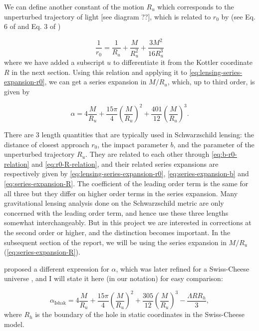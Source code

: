We can define another constant of the motion $R_u$ which corresponds to the unperturbed trajectory of light [see diagram ??], which is related to $r_0$ by (see Eq. 6 of \citet{ishak2008new} and Eq. 3 of \citet{butcher2016no})

\begin{equation}
  \frac{1}{r_0} = \frac{1}{R_u} + \frac{M}{R_u^2} + \frac{3M^2}{16R_u^3}
  \label{eq:r0-R-relation}
\end{equation}
where we have added a subscript $u$ to differentiate it from the Kottler coordinate $R$ in the next section. Using this relation and applying it to \autoref{eq:lensing-series-expansion-r0}, we can get a series expansion in $M/R_u$, which, up to third order, is given by

\begin{equation}
  \alpha = 4 \frac{M}{R_u} + \frac{15\pi}{4} \left ( \frac{M}{R_u} \right )^2 + \frac{401}{12} \left ( \frac{M}{R_u} \right )^3.
  \label{eq:series-expansion-R}
\end{equation}

There are 3 length quantities that are typically used in Schwarzschild lensing: the distance of closest approach $r_0$, the impact parameter $b$, and the parameter of the unperturbed trajectory $R_u$. They are related to each other through \autoref{eq:b-r0-relation} and \autoref{eq:r0-R-relation}, and their related series expansions are respectively given by \autoref{eq:lensing-series-expansion-r0}, \autoref{eq:series-expansion-b} and \autoref{eq:series-expansion-R}. The coefficient of the leading order term is the same for all three but they differ on higher order terms in the series expansion. Many gravitational lensing analysis done on the Schwarzschild metric are only concerned with the leading order term, and hence use these three lengths somewhat interchangeably. But in this project we are interested in corrections at the second order or higher, and the distinction becomes important. In the subsequent section of the report, we will be using the series expansion in $M/R_u$ (\autoref{eq:series-expansion-R}). 

\citet{rindler2007contribution} proposed a different expression for $\alpha$, which was later refined for a Swiss-Cheese universe \citep{ishak2008new}, and I will state it here (in our notation) for easy comparison:

\begin{equation}
  \alpha_{\text{Ishak}} = 4 \frac{M}{R_u} + \frac{15\pi}{4} \left ( \frac{M}{R_u} \right )^2 + \frac{305}{12} \left ( \frac{M}{R_u} \right )^3 - \frac{\Lambda R R_h}{3},
  \label{eq:rindler-ishak-alpha}
\end{equation}
where $R_h$ is the boundary of the hole in static coordinates in the Swiss-Cheese model. 

